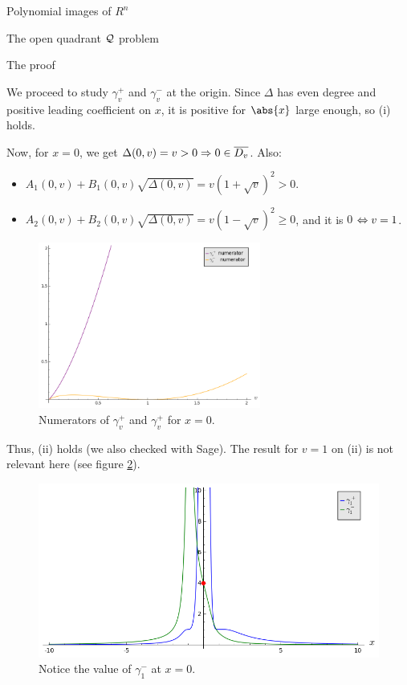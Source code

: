 \documentclass[11pt, a4paper, english, twoside, notitlepage]{report}
\begin{document}
\begin{chapter}{Polynomial images of $R^n$}
\begin{section}{The open quadrant $\mathcal{Q}$ problem}
\begin{subsection}{The proof}
\begin{Proof}
			We proceed to study $\gamma_v^+$ and $\gamma_v^-$ at the origin. Since $\Delta$ has even degree and positive leading coefficient on $x$, it is positive for $\abs{x}$ large enough, so (i) holds.
			
			Now, for $x = 0$, we get $\Delta(0, v) = v > 0 \Rightarrow 0 \in \overline{D_v}$. Also:
			\begin{itemize}
				\item $A_1(0,v) + B_1(0,v) \sqrt{\Delta(0,v)} = v(1+\sqrt{v})^2 > 0$.
				
				\item $A_2(0,v) + B_2(0,v) \sqrt{\Delta(0,v)} = v(1-\sqrt{v})^2 \geq 0$, and it is $0$ $\Leftrightarrow v = 1$.
			\end{itemize}
			
			\begin{figure}[h]
				\centering
				\includegraphics[width=0.65\textwidth]{plots/ch1_08_numerators.png}
				\caption{Numerators of $\gamma_v^+$ and $\gamma_v^+$ for $x = 0$.\label{fig:numerators}}
			\end{figure}
			
			Thus, (ii) holds (we also checked with Sage). The result for $v = 1$ on (ii) is not relevant here (see figure \ref{fig:limit}).
			
			\begin{figure}[h]
				\centering
				\includegraphics[width=1\textwidth]{plots/ch1_09_limit.png}
				\caption{Notice the value of $\gamma_1^-$ at $x = 0$.\label{fig:limit}}
			\end{figure}


\end{Proof}
\end{subsection}
\end{section}
\end{chapter}
\end{document}

